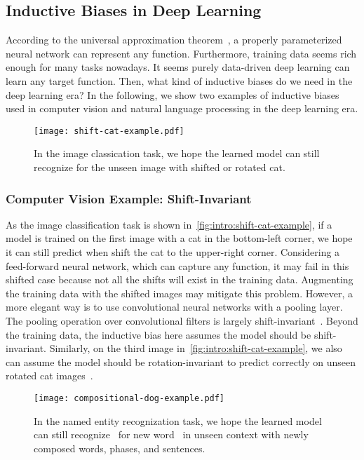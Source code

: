 \subsection{Inductive Biases in Deep Learning}
\label{ssec:intro:bias-source}
According to the universal approximation
theorem~\citep{hornik1989multilayer}, a properly parameterized neural
network can represent any function. Furthermore, training data seems
rich enough for many tasks nowadays. It seems purely data-driven deep
learning can learn any target function. Then, what kind of inductive
biases do we need in the deep learning era? In the following, we show two
examples of inductive biases used in computer vision and natural
language processing in the deep learning era.

\begin{figure}[!tbp]
  \centering
  \texttt{[image: shift-cat-example.pdf]}
  \caption{\label{fig:intro:shift-cat-example}In the image classication
    task, we hope the learned model can still recognize  for the
    unseen image with shifted or rotated cat.}
\end{figure}

\subsubsection{Computer Vision Example: Shift-Invariant}
\label{sssec:intro:cv-example}

As the image classification task is shown
in~\autoref{fig:intro:shift-cat-example}, if a model is trained on the
first image with a cat in the bottom-left corner, we hope it can still
predict  when shift the cat to the upper-right corner.
Considering a feed-forward neural network, which can capture any
function, it may fail in this shifted case because not all the shifts
will exist in the training data. Augmenting the training data with the
shifted images may mitigate this problem. However, a more elegant way
is to use convolutional neural networks with a pooling layer. The
pooling operation over convolutional filters is largely
shift-invariant~\citep{zhang2019making}. Beyond the training data, the
inductive bias here assumes the model should be shift-invariant.
Similarly, on the third image
in~\autoref{fig:intro:shift-cat-example}, we also can assume the model
should be rotation-invariant to predict correctly on unseen rotated
cat images~\citep{cheng2016rifd}.

\begin{figure}[!tbp]
  \centering
  \texttt{[image: compositional-dog-example.pdf]}
  \caption{\label{fig:intro:compositional-dog-example}In the named entity
    recognization task, we hope the learned model can still recognize
    ~for new word~ in unseen context with newly composed
    words, phases, and sentences.}
\end{figure}

